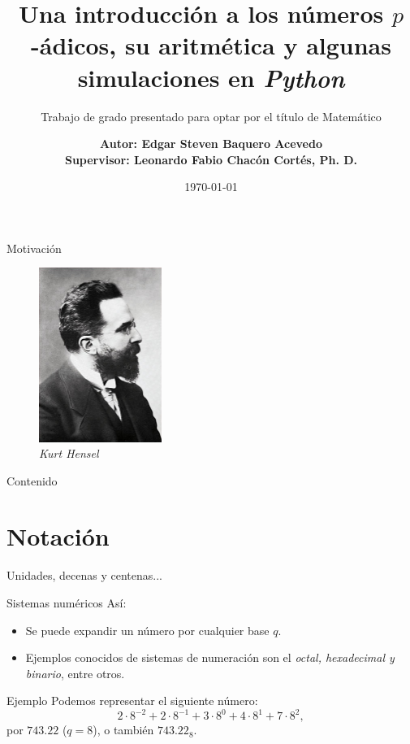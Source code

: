 \documentclass{beamer}
\title{Una introducción a los números $p$-ádicos, su aritmética y algunas simulaciones en \textit{Python}}
\subtitle{Trabajo de grado presentado para optar por el título de
Matemático}
\date{\today}
\author{\bf{Autor: }Edgar Steven Baquero Acevedo
	\\ \bf{Supervisor: }Leonardo Fabio Chacón Cortés, Ph. D.}
\theoremstyle{definition}
\numberwithin{equation}{section}
\newcommand{\tit}[1]{\textit{#1}}
\begin{document}
  \maketitle

\begin{frame}{Motivación}
	\begin{figure}
		\includegraphics[width=4cm]{img/kurt_hensel.jpg}
		\caption{\textit{Kurt Hensel}}
	\end{figure}

\end{frame}

\begin{frame}{Contenido}
	\tableofcontents
\end{frame}
  \section{Notación}

  \begin{frame}{Unidades, decenas y centenas...}
    
    \begin{center}
    \end{center}
  \end{frame}

  \begin{frame}{Sistemas numéricos}
  	Así:
  	\begin{itemize}
  		\item Se puede expandir un número por cualquier base $q$.
 		\item Ejemplos conocidos de sistemas de numeración son el \tit{octal, hexadecimal y binario}, entre otros.
  	\end{itemize}
  \begin{exampleblock}{Ejemplo}
	Podemos representar el siguiente número:
	$$2\cdot8^{-2}+2\cdot8^{-1}+3\cdot8^0+4\cdot8^1+7\cdot8^2,$$
	por $743.22$ ($q=8$), o también $743.22_8$.
  \end{exampleblock}
	 
  \end{frame}
\end{document}
